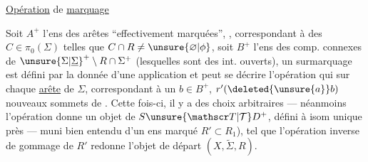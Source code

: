   \uline{Opération} de  \uline{marquage}


 Soit $A^+$ l'ens des arêtes  ``effectivement marquées'',  ,
correspondant à des $C\in\pi_0(\Sigma)$ telles que $C\cap R\ne\unsure{\varnothing|\phi}$, soit $B^+$ l'ens des comp. connexes de $ {\unsure{\Sigma|\underline{\Sigma}}}^{+}\setminus R\cap\Sigma^{+}$ (lesquelles sont des int. ouverts), un surmarquage est défini par la donnée d'une application
et peut se décrire   l'opération qui  sur chaque \uline{arête}  de $\Sigma$, correspondant à un $b\in B^{+}$, $r'(\deleted{\unsure{a}}b)$ nouveaux sommets de . Cette fois-ci,  il y a des choix arbitraires --- néanmoins l'opération donne un objet de $S{\unsure{\mathscr T|\mathcal T}}D^{+}$, défini  à isom unique près --- muni bien entendu d'un ens marqué $R'\subset R_{1}$), tel que l'opération inverse de gommage de $R'$ redonne l'objet de départ $(X,\widetilde{\Sigma},R)$.
